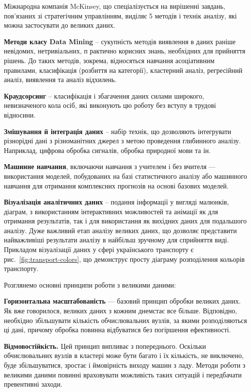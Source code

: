Міжнародна компанія McKinsey,
що спеціалізується на вирішенні завдань,
пов'язаних зі стратегічним управлінням,
виділяє 5 методів і технік аналізу,
які можна застосувати до великих даних.

\textbf{Методи класу Data Mining} – сукупність методів виявлення в даних раніше невідомих, нетривіальних, п
рактично корисних знань, необхідних для прийняття рішень.
До таких методів, зокрема, відносяться навчання асоціативним правилами,
класифікація (розбиття на категорії), кластерний аналіз, регресійний аналіз,
виявлення та аналіз відхилень.

\textbf{Краудсорсинг} – класифікація і збагачення даних силами широкого,
невизначеного кола осіб,
які виконують цю роботу без вступу в трудові відносини.

\textbf{Змішування й інтеграція даних} – набір технік, що дозволяють інтегрувати різнорідні дані з
різноманітних джерел з метою проведення глибинного аналізу.
Наприклад, цифрова обробка сигналів, обробка природної мови та ін.

\textbf{Машинне навчання}, включаючи навчання з учителем і без вчителя —
використання моделей, побудованих на базі статистичного аналізу або машинного навчання для
отримання комплексних прогнозів на основі базових моделей.

\textbf{Візуалізація аналітичних даних} – подання інформації у вигляді малюнків, діаграм,
з використанням інтерактивних можливостей та анімації як для отримання результатів,
так і для використання як вихідних даних для подальшого аналізу.
Дуже важливий етап аналізу великих даних,
що дозволяє представити найважливіші результати аналізу в найбільш зручному для сприйняття виді.
Прикладом візуалізації даних у сфері українського транспорту є рис.~\ref{fig:transport-colors},
що демонструє просту діаграму розподілення кольорів транспорту.

Розглянемо основні принципи роботи з великими даними:

\textbf{Горизонтальна масштабованість} — базовий принцип обробки великих даних.
Як вже говорилося, великих даних з кожним днем ​​стає все більше.
Відповідно, необхідно збільшувати кількість обчислювальних вузлів,
за якими розподіляються ці дані,
причому обробка повинна відбуватися без погіршення ефективності.

\textbf{Відмовостійкість.} Цей принцип випливає з попереднього.
Оскільки обчислювальних вузлів в кластері може бути багато і їх кількість,
не виключено, буде збільшуватися, зростає і ймовірність виходу машин з ладу.
Методи роботи з великими даними повинні враховувати можливість
таких ситуацій і передбачати превентивні заходи.

